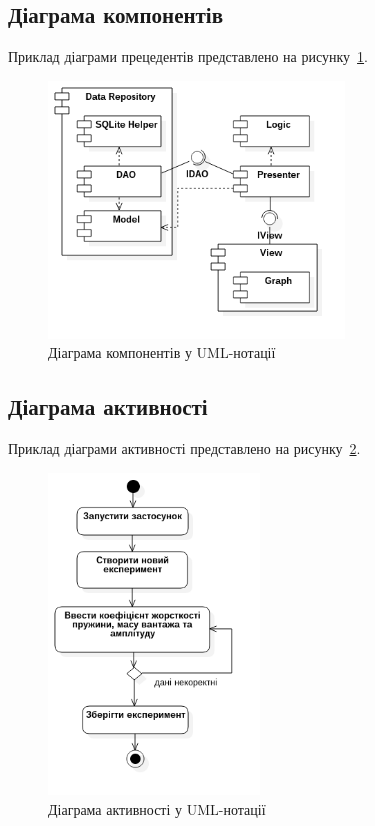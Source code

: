 \subsection{Діаграма компонентів}
Приклад діаграми прецедентів представлено на рисунку~\ref{fig:uml_component}.

\begin{figure}[H]
    \centering
        \includegraphics[width=0.7\textwidth]{uml_component}
    \caption{Діаграма компонентів у UML-нотації}
    \label{fig:uml_component}
\end{figure}

\subsection{Діаграма активності}
Приклад діаграми активності представлено на рисунку~\ref{fig:uml_activity_create_ex}.

\begin{figure}[H]
  \centering
    \includegraphics[width=0.5\textwidth]{uml_activity_create_ex}
  \caption{Діаграма активності у UML-нотації}
  \label{fig:uml_activity_create_ex}
\end{figure}

